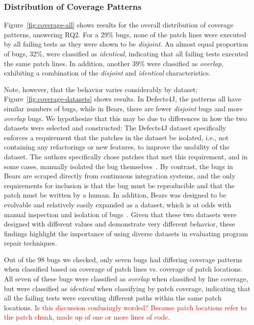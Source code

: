 \documentclass[10pt, conference]{IEEEtran}
\newcommand\todo[1]{\textcolor{red}{#1}}
\begin{document}
\subsubsection{Distribution of Coverage Patterns} \label{sec:cov_patterns}

Figure~\ref{fig:coverage-all} shows results for the overall distribution of coverage patterns, 
answering RQ2. 
For a 29\% bugs, none of the patch lines were executed by all failing tests as they were 
shown to be \emph{disjoint}.  An almost equal proportion of bugs, 32\%, were classified as 
\emph{identical}, indicating that all failing tests executed the same patch lines.
In addition, another 39\% were classified as \emph{overlap}, exhibiting a combination of the 
\emph{disjoint} and \emph{identical} characteristics.

Note, however, that the behavior varies considerably by dataset;
Figure~\ref{fig:coverage-datasets} shows results. In Defects4J, the patterns all have similar 
numbers of bugs, while in Bears, there are fewer \emph{disjoint} bugs and more 
\emph{overlap} 
bugs.
We hypothesize that this may be due to differences in how the two  
datasets were selected and constructed:
The Defects4J dataset specifically enforces a requirement that the patches in the 
dataset be isolated, i.e., not containing any refactorings or new features, to improve the 
usability of the dataset. The authors specifically chose patches that met this requirement, 
and in some cases, manually isolated the bug themselves~\cite{defects4j}. By contrast, the 
bugs in 
Bears are scraped directly from continuous integration systems, and the 
only requirements for inclusion is that the bug must be reproducible and that
the patch must be written by a human. In addition, Bears was designed to be evolvable 
and relatively easily expanded as a dataset, which is at odds with manual inspection and isolation of 
bugs~\cite{bears}.
Given that these two datasets were designed with different values and demonstrate very 
different behavior, these findings highlight the importance of using diverse datasets in 
evaluating program repair techniques.

Out of the 98 bugs we checked, only seven bugs had differing coverage patterns when 
classified based on coverage of patch lines vs. coverage of patch locations. All seven of these 
bugs 
were classified as \emph{overlap} when classified by line coverage, but were classified as 
\emph{identical} when classifying by patch coverage, indicating that all the failing tests were 
executing different paths within the same patch locations. \todo{Is this discussion confusingly 
worded? Because patch locations refer to the patch chunk, made up of one or more lines of 
code.}
\end{document}
